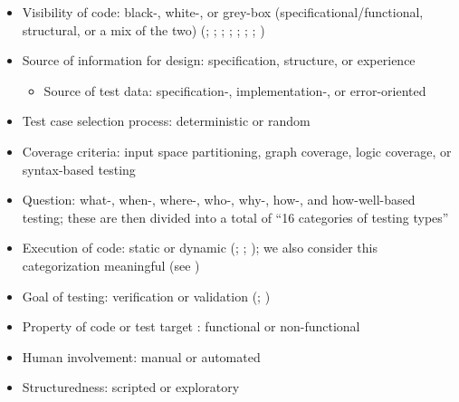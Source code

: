 \begin{itemize}
    \item Visibility of code: black-, white-, or grey-box
          (specificational/functional, structural, or a mix of the two)
          (\citealp[p.~8]{IEEE2021}; \citealp[pp.~5-10,~5-16]{SWEBOK2024};
          \citealp[p.~601, called ``testing approaches'' and (stepwise) code
              reading replaced ``grey-box testing'']{SharmaEtAl2021};
          \citealp[pp.~57-58]{AmmannAndOffutt2017};
          \citealp[p.~213]{KuļešovsEtAl2013};
          \citealp[pp.~53,~218]{Patton2006}; \citealp[p.~69]{Perry2006};
          \citealp[pp.~4-5, called ``testing methods'']{Kam2008})
    \item Source of information for design: specification, structure, or
          experience \citep[p.~8]{IEEE2021}
          \begin{itemize}
              \item Source of test data: specification-, implementation-,
                    or error-oriented \citep[p.~440]{PetersAndPedrycz2000}
          \end{itemize}
    \item Test case selection process: deterministic or random
          \citep[p.~5-16]{SWEBOK2024}
    \item Coverage criteria: input space partitioning, graph coverage, logic
          coverage, or syntax-based testing \citep[pp.~18-19]{AmmannAndOffutt2017}
    \item Question: what-, when-, where-, who-, why-, how-, and how-well-based
          testing; these are then divided into a total of ``16 categories of
          testing types''
          \citep[p.~17]{Firesmith2015}
    \item Execution of code: static or dynamic
          (\citealp[p.~214]{KuļešovsEtAl2013}; \citealp[p.~12]{Gerrard2000a};
          \citealp[p.~53]{Patton2006}); we also consider this categorization
          meaningful (see )
    \item Goal of testing: verification or validation
          (\citealp[p.~214]{KuļešovsEtAl2013}; \citealp[pp.~69-70]{Perry2006})
    \item Property of code \citep[p.~213]{KuļešovsEtAl2013} or test target
          \citep[pp.~4-5]{Kam2008}: functional or non-functional
    \item Human involvement: manual or automated
          \citep[p.~214]{KuļešovsEtAl2013}
    \item Structuredness: scripted or exploratory

\end{itemize}
